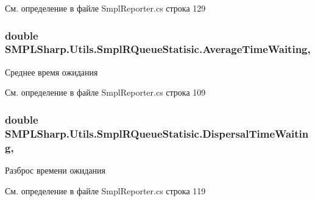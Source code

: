 См. определение в файле Smpl\-Reporter.\-cs строка 129

\hypertarget{class_s_m_p_l_sharp_1_1_utils_1_1_smpl_r_queue_statisic_a219830367adab4aac8538c90ebfba282}{
\subsubsection[{Average\-Time\-Waiting}]{\setlength{\rightskip}{0pt plus 5cm}double S\-M\-P\-L\-Sharp.\-Utils.\-Smpl\-R\-Queue\-Statisic.\-Average\-Time\-Waiting\hspace{0.3cm}{\ttfamily [get]}, {\ttfamily [set]}}}\label{de/de9/class_s_m_p_l_sharp_1_1_utils_1_1_smpl_r_queue_statisic_a219830367adab4aac8538c90ebfba282}


Среднее время ожидания 



См. определение в файле Smpl\-Reporter.\-cs строка 109

\hypertarget{class_s_m_p_l_sharp_1_1_utils_1_1_smpl_r_queue_statisic_ac39d2d7f7417cccfb3f7c8e8ccbb34e6}{
\subsubsection[{Dispersal\-Time\-Waiting}]{\setlength{\rightskip}{0pt plus 5cm}double S\-M\-P\-L\-Sharp.\-Utils.\-Smpl\-R\-Queue\-Statisic.\-Dispersal\-Time\-Waiting\hspace{0.3cm}{\ttfamily [get]}, {\ttfamily [set]}}}\label{de/de9/class_s_m_p_l_sharp_1_1_utils_1_1_smpl_r_queue_statisic_ac39d2d7f7417cccfb3f7c8e8ccbb34e6}


Разброс времени ожидания 



См. определение в файле Smpl\-Reporter.\-cs строка 119

